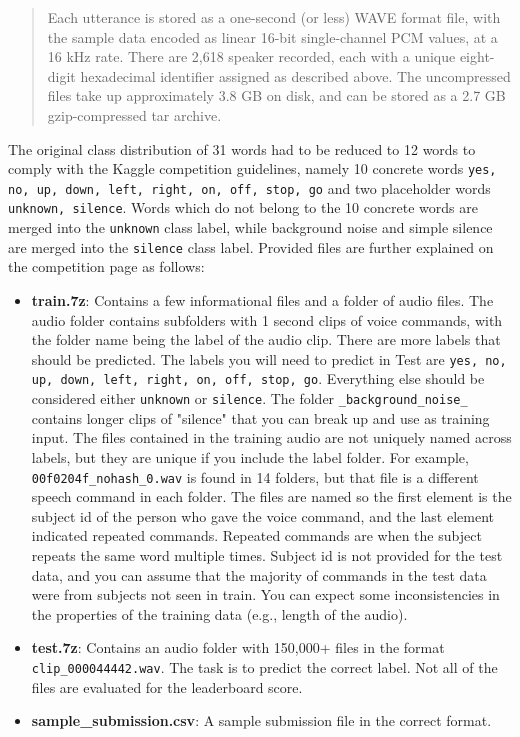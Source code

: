 \documentclass{article}
\theoremstyle{definition}
\theoremstyle{remark}
\begin{document}
\begin{quote}
Each utterance is stored as a one-second (or less) WAVE format file, with the sample data encoded as linear 16-bit single-channel PCM values, at a 16 kHz rate. There are 2,618 speaker recorded, each with a unique eight-digit hexadecimal identifier assigned as described above. The uncompressed files take up approximately 3.8 GB on disk, and can be stored as a 2.7 GB gzip-compressed tar archive.
\end{quote}

The original class distribution of 31 words had to be reduced to 12 words to comply with the Kaggle competition guidelines, namely 10 concrete words \texttt{yes, no, up, down, left, right, on, off, stop, go} and two placeholder words \texttt{unknown, silence}. Words which do not belong to the 10 concrete words are merged into the \texttt{unknown} class label, while background noise and simple silence are merged into the \texttt{silence} class label. Provided files are further explained on the competition page \cite{kaggle_challenge} as follows:

\begin{itemize}
	\item \textbf{train.7z}: Contains a few informational files and a folder of audio files. The audio folder contains subfolders with 1 second clips of voice commands, with the folder name being the label of the audio clip. There are more labels that should be predicted. The labels you will need to predict in Test are \texttt{yes, no, up, down, left, right, on, off, stop, go}. Everything else should be considered either \texttt{unknown} or \texttt{silence}. The folder \texttt{\_background\_noise\_} contains longer clips of "silence" that you can break up and use as training input. The files contained in the training audio are not uniquely named across labels, but they are unique if you include the label folder. For example, \texttt{00f0204f\_nohash\_0.wav} is found in 14 folders, but that file is a different speech command in each folder. The files are named so the first element is the subject id of the person who gave the voice command, and the last element indicated repeated commands. Repeated commands are when the subject repeats the same word multiple times. Subject id is not provided for the test data, and you can assume that the majority of commands in the test data were from subjects not seen in train. You can expect some inconsistencies in the properties of the training data (e.g., length of the audio).
	\item \textbf{test.7z}: Contains an audio folder with 150,000+ files in the format \texttt{clip\_000044442.wav}. The task is to predict the correct label. Not all of the files are evaluated for the leaderboard score.
	\item \textbf{sample\_submission.csv}: A sample submission file in the correct format.
\end{itemize}
\end{document}
